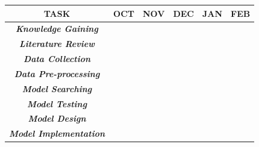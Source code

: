 \FloatBarrier
\begin{table}[]
\centering
\begin{tabular}{|c|l|l|l|l|l|}
\hline
\textbf{TASK}                                 & \multicolumn{1}{c|}{\textbf{OCT}}             & \multicolumn{1}{c|}{\textbf{NOV}}             & \textbf{DEC}             & \textbf{JAN}             & \textbf{FEB}             \\ \hline
\textit{\textbf{Knowledge Gaining}}           & \multicolumn{1}{c|}{\cellcolor[HTML]{FFCB2F}} & \multicolumn{1}{c|}{\cellcolor[HTML]{FFCB2F}} & \cellcolor[HTML]{FFCB2F} & \cellcolor[HTML]{FFCB2F} & \cellcolor[HTML]{FFCB2F} \\ \hline
\textit{\textbf{Literature Review}}           & \multicolumn{1}{c|}{\cellcolor[HTML]{FFCB2F}} & \multicolumn{1}{c|}{\cellcolor[HTML]{FFCB2F}} & \cellcolor[HTML]{FFCB2F} &                          &                          \\ \hline
\textit{\textbf{Data Collection}}             & \multicolumn{1}{c|}{}                         & \multicolumn{1}{c|}{\cellcolor[HTML]{FFCB2F}} & \cellcolor[HTML]{FFCB2F} &                          &                          \\ \hline
\textit{\textbf{Data Pre-processing}}         & \multicolumn{1}{c|}{}                         & \multicolumn{1}{c|}{\cellcolor[HTML]{FFCB2F}} & \cellcolor[HTML]{FFCB2F} &                          &                          \\ \hline
\textit{\textbf{Model Searching}}             &                                               & \cellcolor[HTML]{FFCB2F}                      & \cellcolor[HTML]{FFCB2F} &                          &                          \\ \hline
\textit{\textbf{Model Testing}}               &                                               &                                               & \cellcolor[HTML]{FFCB2F} & \cellcolor[HTML]{FFCB2F} &                          \\ \hline
\textit{\textbf{Model Design}}                &                                               &                                               & \cellcolor[HTML]{FFCB2F} & \cellcolor[HTML]{FFCB2F} &                          \\ \hline
\textit{\textbf{Model Implementation}}        &                                               &                                               & \cellcolor[HTML]{FFCB2F} & \cellcolor[HTML]{FFCB2F} &                          \\ \hline

\end{tabular}
\end{table}
